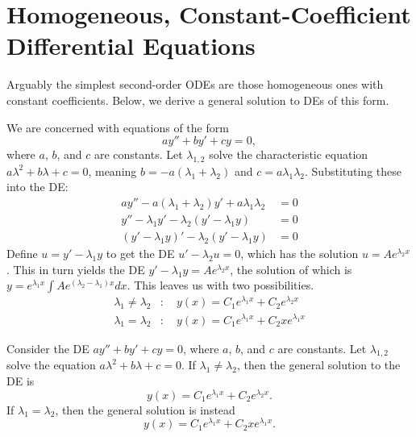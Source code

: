 \documentclass[../m082main.tex]{subfiles}
\begin{document}
\section{Homogeneous, Constant-Coefficient Differential Equations}
Arguably the simplest second-order ODEs are those homogeneous ones with constant coefficients.
Below, we derive a general solution to DEs of this form.

\begin{example}
    We are concerned with equations of the form
    \[ ay'' + by' + cy = 0, \]
    where $a$, $b$, and $c$ are constants.
    Let $\lambda_{1,2}$ solve the characteristic equation $a \lambda^2 + b \lambda + c = 0$, meaning $b = -a(\lambda_1 + \lambda_2)$ and $c = a \lambda_1 \lambda_2$.
    Substituting these into the DE:
    \begin{align*}
        ay'' - a(\lambda_1 + \lambda_2)y' + a \lambda_1 \lambda_2 &= 0 \\
        y'' - \lambda_1 y' - \lambda_2 (y' - \lambda_1 y) &= 0 \\
        (y' - \lambda_1 y)' - \lambda_2 (y' - \lambda_1 y) &= 0
    \end{align*}
    Define $u = y' - \lambda_1 y$ to get the DE $u' - \lambda_2 u = 0$, which has the solution $u = Ae^{\lambda_2 x}$.
    This in turn yields the DE $y' - \lambda_1 y = Ae^{\lambda_2 x}$, the solution of which is $\displaystyle y = e^{\lambda_1 x} \int Ae^{(\lambda_2 - \lambda_1)x} dx$.
    This leaves us with two possibilities.
    \begin{align*}
        \lambda_1 \neq \lambda_2&:\quad y(x) = C_1 e^{\lambda_1 x} + C_2 e^{\lambda_2 x} \\
        \lambda_1 = \lambda_2&:\quad y(x) = C_1e^{\lambda_1 x} + C_2 x e^{\lambda_1 x}
    \end{align*}
\end{example}

\begin{theorem}
    Consider the DE $ay'' + by' + cy = 0$, where $a$, $b$, and $c$ are constants.
    Let $\lambda_{1,2}$ solve the equation $a\lambda^2 + b\lambda + c = 0$.
    If $\lambda_1 \neq \lambda_2$, then the general solution to the DE is
    \[ y(x) = C_1 e^{\lambda_1 x} + C_2 e^{\lambda_2 x}. \]
    If $\lambda_1 = \lambda_2$, then the general solution is instead
    \[ y(x) = C_1 e^{\lambda_1 x} + C_2 x e^{\lambda_1 x}. \]
\end{theorem}
\end{document}
